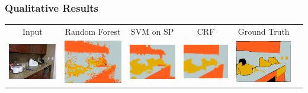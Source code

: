 \documentclass[final,ignorenonframetext,compress]{beamer}
\begin{document}
\begin{frame}
    \frametitle{Qualitative Results}
    \begin{tabularx}{\linewidth}{@{\extracolsep{\fill}}cccccc}
    \footnotesize Input&
    \footnotesize Random Forest&
    \footnotesize SVM on SP&
    \footnotesize CRF&
    \footnotesize Ground Truth\\

    \includegraphics[width=.17\textwidth]{images/00845_image.png}&%
    \includegraphics[width=.17\linewidth]{images/00845_pixel.png}&%
    \includegraphics[width=.17\linewidth]{images/00845_svm.png}&%
    \includegraphics[width=.17\linewidth]{images/00845_ssvm.png}&%
    \includegraphics[width=.17\linewidth]{images/00845_gt.png}\\


\end{tabularx}
\end{frame}
\end{document}
